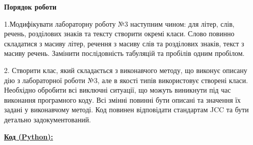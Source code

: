 \documentclass[12pt,a4paper]{article}
\begin{document}
    \begin{center}
        \textbf{\Large Порядок роботи}
    \end{center}

    \setlength{\parindent}{1em}

    1.\quad Модифікувати лабораторну роботу №3 наступним чином: для літер, слів,
    речень, розділових знаків та тексту створити окремі класи. Слово повинно
    складатися з масиву літер, речення з масиву слів та розділових знаків, текст з
    масиву речень. Замінити послідовність табуляцій та пробілів одним пробілом.

    \vspace{0.5em}

    2. \quad Створити клас, який складається з виконавчого методу, що виконує описану
    дію з лабораторної роботи №3, але в якості типів використовує створені класи.
    Необхідно обробити всі виключні ситуації, що можуть виникнути під час
    виконання програмного коду. Всі змінні повинні бути описані та значення їх
    задані у виконавчому методі. Код повинен відповідати стандартам JCC та бути
    детально задокументований.

    \setlength{\parindent}{0pt}
    \vspace{2em}

    \textbf{\underline{Код (Python):}}
\end{document}
